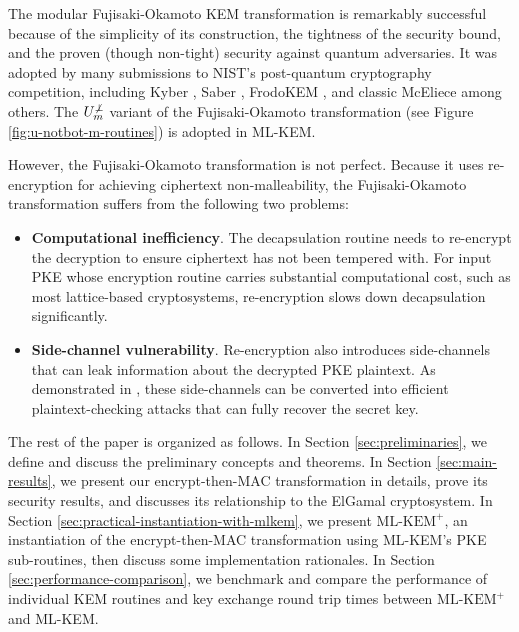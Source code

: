 \documentclass[journal=tches,submission]{iacrtrans}
\def\mlkemplus{\text{ML-KEM}^+}
\begin{document}
The modular Fujisaki-Okamoto KEM transformation is remarkably successful because of the simplicity of its construction, the tightness of the security bound, and the proven (though non-tight) security against quantum adversaries. It was adopted by many submissions to NIST's post-quantum cryptography competition, including Kyber \cite{DBLP:conf/eurosp/BosDKLLSSSS18}, Saber \cite{DBLP:conf/africacrypt/DAnversKRV18}, FrodoKEM \cite{DBLP:conf/ccs/BosCDMNNRS16}, and classic McEliece \cite{classicmceliecespec} among others. The $U^{\not\bot}_m$ variant of the Fujisaki-Okamoto transformation (see Figure \ref{fig:u-notbot-m-routines}) is adopted in ML-KEM.

However, the Fujisaki-Okamoto transformation is not perfect. Because it uses re-encryption for achieving ciphertext non-malleability, the Fujisaki-Okamoto transformation suffers from the following two problems: \begin{itemize}
    \item \textbf{Computational inefficiency}. The decapsulation routine needs to re-encrypt the decryption to ensure ciphertext has not been tempered with. For input PKE whose encryption routine carries substantial computational cost, such as most lattice-based cryptosystems, re-encryption slows down decapsulation significantly.
    \item \textbf{Side-channel vulnerability}. Re-encryption also introduces side-channels that can leak information about the decrypted PKE plaintext. As demonstrated in \cite{ueno2022curse}\cite{ravi2019generic}\cite{DBLP:journals/tches/TanakaUXITH23}, these side-channels can be converted into efficient plaintext-checking attacks that can fully recover the secret key.
\end{itemize}

The rest of the paper is organized as follows. In Section \ref{sec:preliminaries}, we define and discuss the preliminary concepts and theorems. In Section \ref{sec:main-results}, we present our encrypt-then-MAC transformation in details, prove its security results, and discusses its relationship to the ElGamal cryptosystem. In Section \ref{sec:practical-instantiation-with-mlkem}, we present $\mlkemplus$, an instantiation of the encrypt-then-MAC transformation using ML-KEM's PKE sub-routines, then discuss some implementation rationales. In Section \ref{sec:performance-comparison}, we benchmark and compare the performance of individual KEM routines and key exchange round trip times between $\mlkemplus$ and ML-KEM.
\end{document}
